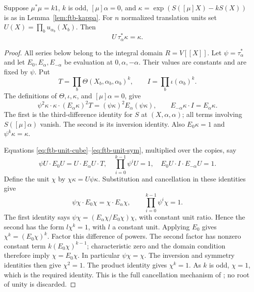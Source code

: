 \begin{srlemma}\label{lem:ftb-unit-kappa-ratio}
Suppose \(\mu^*\mu=k1\), \(k\) is odd, \([\mu]\alpha=0\), and
\(\kappa=\exp(S([\mu]X)-kS(X))\) is as in
Lemma~\ref{lem:ftb-kappa}.
For \(n\) normalized translation units set
\(U(X)=\prod_bu_{\alpha_b}(X_b)\).
Then
\[
                            U\,\tau_\alpha^*\kappa=\kappa .
\]
\end{srlemma}
\begin{proof}
All series below belong to the integral domain \(R=V[[X]]\).
Let \(\psi=\tau_\alpha^*\) and let \(E_0,E_\alpha,E_{-\alpha}\)
be evaluation at \(0,\alpha,-\alpha\).
Their values are constants and are fixed by \(\psi\).
Put
\[
 T=\prod_b\Theta(X_b,\alpha_b,\alpha_b)^k,\qquad
 I=\prod_b\iota(\alpha_b)^k .
\]
The definitions of \(\Theta,\iota,\kappa\), and
\([\mu]\alpha=0\), give
\[
 \psi^2\kappa\cdot\kappa\cdot(E_\alpha\kappa)^2T
       =(\psi\kappa)^2E_\alpha(\psi\kappa),\qquad
 E_{-\alpha}\kappa\cdot I=E_\alpha\kappa .
\]
The first is the third-difference identity for \(S\) at
\((X,\alpha,\alpha)\); all terms involving
\(S([\mu]\alpha)\) vanish.
The second is its inversion identity.
Also \(E_0\kappa=1\) and \(\psi^k\kappa=\kappa\).

Equations \eqref{eq:ftb-unit-cube}--\eqref{eq:ftb-unit-sym}, multiplied
over the copies, say
\[
 \psi U\cdot E_0U=U\cdot E_\alpha U\cdot T,\quad
 \prod_{i=0}^{k-1}\psi^iU=1,\quad
 E_0U\cdot I\cdot E_{-\alpha}U=1 .
\]
Define the unit \(\chi\) by
\(\chi\kappa=U\psi\kappa\).
Substitution and cancellation in these identities give
\[
                 \psi\chi\cdot E_0\chi
                                  =\chi\cdot E_\alpha\chi,\qquad
                  \prod_{i=0}^{k-1}\psi^i\chi=1.
\]
The first identity says
\(\psi\chi=(E_\alpha\chi/E_0\chi)\chi\), with constant unit ratio.
Hence the second has the form \(l\chi^k=1\), with \(l\) a constant
unit.  Applying \(E_0\) gives \(\chi^k=(E_0\chi)^k\).
Factor this difference of powers.
The second factor has nonzero constant term
\(k(E_0\chi)^{k-1}\); characteristic zero and the domain condition
therefore imply \(\chi=E_0\chi\).
In particular \(\psi\chi=\chi\).
The inversion and symmetry identities then give \(\chi^2=1\).
The product identity gives \(\chi^k=1\).
As \(k\) is odd, \(\chi=1\), which is the required identity.
This is the full cancellation mechanism of
;
no root of unity is discarded.
\end{proof}

